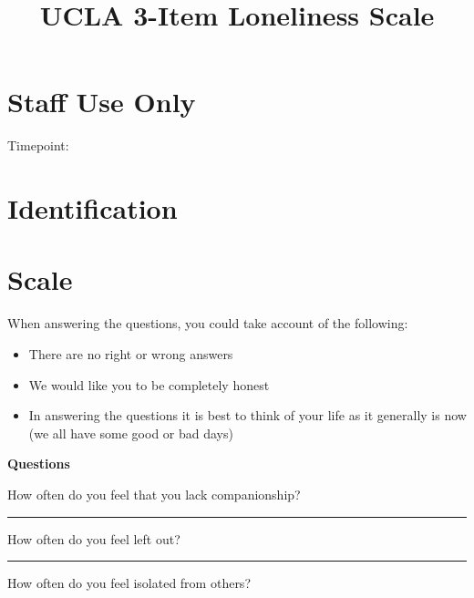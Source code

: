 \documentclass[
  english,
  a4paper,
  sdaps_style=qr,
  checkmode= check
]{sdapsclassic}
\title{UCLA 3-Item Loneliness Scale}
\author{}
\date{}
\begin{document}
\begin{questionnaire}[noinfo]

\section{Staff Use Only}
    \begin{optionquestion}[cols=3, var=timepoint]{Timepoint:}
    \end{optionquestion}

\section{Identification}

\section{Scale}
When answering the questions, you could take account of the following: 
\begin{itemize}
    \item There are no right or wrong answers
    \item We would like you to be completely honest
    \item In answering the questions it is best to think of your life as it generally is now \\(we all have some good or bad days)
\end{itemize}

\vspace{0.5em}

\textbf{Questions}
\begin{optionquestion}[cols=1, singlechoice, var=ucla01]{How often do you feel that you lack companionship?}
\end{optionquestion}

\rule{\linewidth}{1pt}

\begin{optionquestion}[cols=1, singlechoice, var=ucla02]{How often do you feel left out?}
\end{optionquestion}

\rule{\linewidth}{1pt}

\begin{optionquestion}[cols=1, singlechoice, var=ucla03]{How often do you feel isolated from others?}
\end{optionquestion}
\end{questionnaire}
\end{document}
